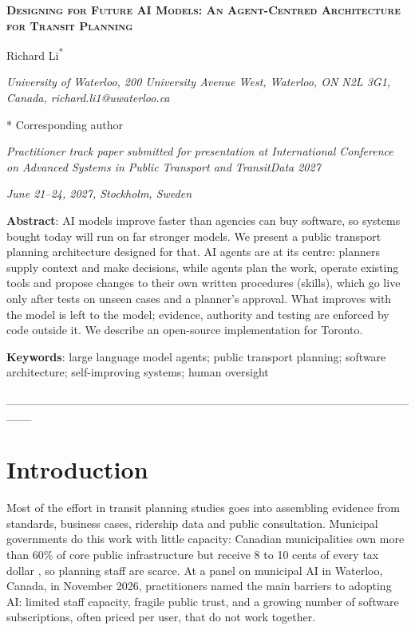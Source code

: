 \documentclass[11pt,a4paper]{article}
\author{}
\date{}
\begin{document}
{\centering

{\fontsize{16}{19}
\selectfont
\textbf{\textsc{Designing for Future AI Models: An Agent-Centred Architecture for Transit Planning}}}

\vspace{16pt}

 Richard Li\textsuperscript{*}

\textit{University of Waterloo, 200 University Avenue West, Waterloo, ON N2L 3G1, Canada, richard.li1@uwaterloo.ca}

* Corresponding author

\vspace{12pt}

\emph{Practitioner track paper submitted for presentation at International Conference
on Advanced Systems in Public Transport and TransitData 2027}

\emph{June 21--24, 2027, Stockholm, Sweden}

\vspace{12pt}

}

\textbf{Abstract}: AI models improve faster than agencies can buy software, so systems bought today will run on far stronger models. We present a public transport planning architecture designed for that. AI agents are at its centre: planners supply context and make decisions, while agents plan the work, operate existing tools and propose changes to their own written procedures (skills), which go live only after tests on unseen cases and a planner's approval. What improves with the model is left to the model; evidence, authority and testing are enforced by code outside it. We describe an open-source implementation for Toronto.

\textbf{Keywords}: large language model agents; public transport planning; software architecture; self-improving systems; human oversight

\_\_\_\_\_\_\_\_\_\_\_\_\_\_\_\_\_\_\_\_\_\_\_\_\_\_\_\_\_\_\_\_\_\_\_\_\_\_\_\_\_\_\_\_\_\_\_\_\_\_\_

\section{Introduction}\label{introduction}

Most of the effort in transit planning studies goes into assembling evidence from standards, business cases, ridership data and public consultation. Municipal governments do this work with little capacity: Canadian municipalities own more than 60\% of core public infrastructure but receive 8 to 10 cents of every tax dollar \citep{fcm2025}, so planning staff are scarce. At a panel on municipal AI in Waterloo, Canada, in November 2026, practitioners named the main barriers to adopting AI: limited staff capacity, fragile public trust, and a growing number of software subscriptions, often priced per user, that do not work together.
\end{document}
